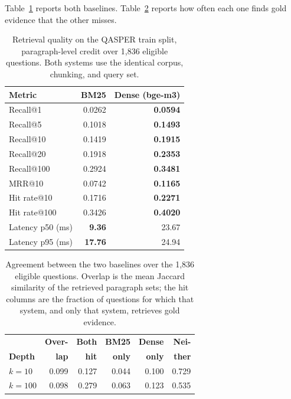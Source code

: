 \documentclass[sigconf,nonacm]{acmart}
\begin{document}
Table~\ref{tab:results} reports both baselines. Table~\ref{tab:overlap} reports
how often each one finds gold evidence that the other misses.

\begin{table}[tb]
\centering
\small
\caption{Retrieval quality on the QASPER train split, paragraph-level credit over
1{,}836 eligible questions. Both systems use the identical corpus, chunking, and
query set.}
\label{tab:results}
\begin{tabular}{@{}lrr@{}}
\toprule
\textbf{Metric} & \textbf{BM25} & \textbf{Dense (bge-m3)} \\
\midrule
Recall@1       & 0.0262 & \textbf{0.0594} \\
Recall@5       & 0.1018 & \textbf{0.1493} \\
Recall@10      & 0.1419 & \textbf{0.1915} \\
Recall@20      & 0.1918 & \textbf{0.2353} \\
Recall@100     & 0.2924 & \textbf{0.3481} \\
MRR@10         & 0.0742 & \textbf{0.1165} \\
Hit rate@10    & 0.1716 & \textbf{0.2271} \\
Hit rate@100   & 0.3426 & \textbf{0.4020} \\
\midrule
Latency p50 (ms) & \textbf{9.36}  & 23.67 \\
Latency p95 (ms) & \textbf{17.76} & 24.94 \\
\bottomrule
\end{tabular}
\end{table}

\begin{table}[tb]
\centering
\small
\caption{Agreement between the two baselines over the 1{,}836 eligible
questions. Overlap is the mean Jaccard similarity of the retrieved paragraph
sets; the hit columns are the fraction of questions for which that system, and
only that system, retrieves gold evidence.}
\label{tab:overlap}
\begin{tabular}{@{}lrrrrr@{}}
\toprule
 & \textbf{Over-} & \textbf{Both} & \textbf{BM25} & \textbf{Dense} & \textbf{Nei-} \\
\textbf{Depth} & \textbf{lap} & \textbf{hit} & \textbf{only} & \textbf{only} & \textbf{ther} \\
\midrule
$k = 10$  & 0.099 & 0.127 & 0.044 & 0.100 & 0.729 \\
$k = 100$ & 0.098 & 0.279 & 0.063 & 0.123 & 0.535 \\
\bottomrule
\end{tabular}
\end{table}
\end{document}
